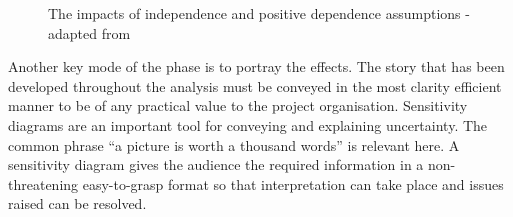 \begin{figure}[!h]
  \centering
{}

\caption{The impacts of independence and positive dependence assumptions - adapted from \cite{chapman}}
\label{Figure:ImpactsDependence}
\end{figure}

Another key mode of the phase is to portray the effects. 
The story that has been developed throughout the analysis must be conveyed in the most clarity efficient manner to be of any practical value to the project organisation.
Sensitivity diagrams are an important tool for conveying and explaining uncertainty.
The common phrase ``a picture is worth a thousand words'' is relevant here.
A sensitivity diagram gives the audience the required information in a non-threatening easy-to-grasp format so that interpretation can take place and issues raised can be resolved.

